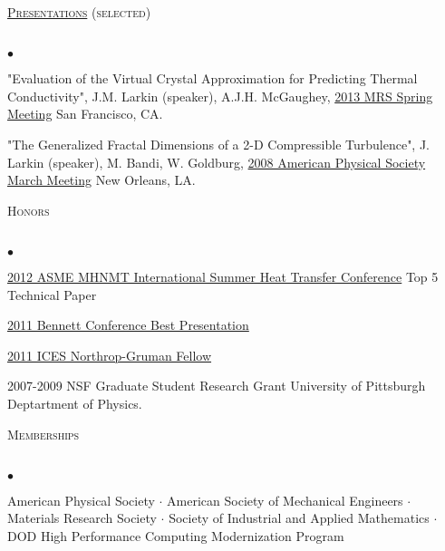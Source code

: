 \documentclass{article}
\newcommand{\lineunder}{\vspace*{-8pt} \\ \hspace*{-18pt} \hrulefill \\}
\newcommand{\header}[1]{{\hspace*{-15pt}\vspace*{6pt} \textsc{#1}} \vspace*{-6pt} \lineunder}
\newenvironment{achievements}{\begin{list}{$\bullet$}{\topsep 0pt \itemsep -2pt}}{\vspace*{4pt}\end{list}}
\begin{document}
\header{\href{http://jasonlarkin.github.io/pres.html}{Presentations} (selected)}
\begin{achievements}
\item "Evaluation of the Virtual Crystal Approximation for Predicting Thermal Conductivity", J.M. Larkin (speaker), A.J.H.
   McGaughey, \href{http://www.mrs.org/spring2013/}{2013 MRS Spring Meeting} San Francisco, CA.
\item "The Generalized Fractal Dimensions of a 2-D Compressible Turbulence", J. Larkin (speaker), M. Bandi, W. Goldburg, \href{http://meetings.aps.org/Meeting/MAR08/Content/1017}{2008 American Physical Society March Meeting} New Orleans, LA.
\end{achievements}


\header{Honors}
\begin{achievements}
\item \href{http://www.asmeconferences.org/HT2012/}{2012 ASME MHNMT International Summer Heat Transfer Conference} Top 5 Technical Paper
\item \href{http://www.cmu.edu/me/news/archive/2011/bennett-conference.html}{2011 Bennett Conference Best Presentation}
\item \href{www.ices.cmu.edu/downloads/inews/iNews-Fall-2011.pdf‎}{2011 ICES Northrop-Gruman Fellow}
\item 2007-2009 NSF Graduate Student Research Grant University of Pittsburgh Deptartment of Physics.
\end{achievements}

\header{Memberships}
\begin{achievements}
\item American Physical Society $\cdot$ American Society of Mechanical Engineers 
$\cdot$ Materials Research Society $\cdot$ Society of Industrial and Applied Mathematics $\cdot$ DOD High Performance Computing Modernization Program
\end{achievements}
\end{document}
